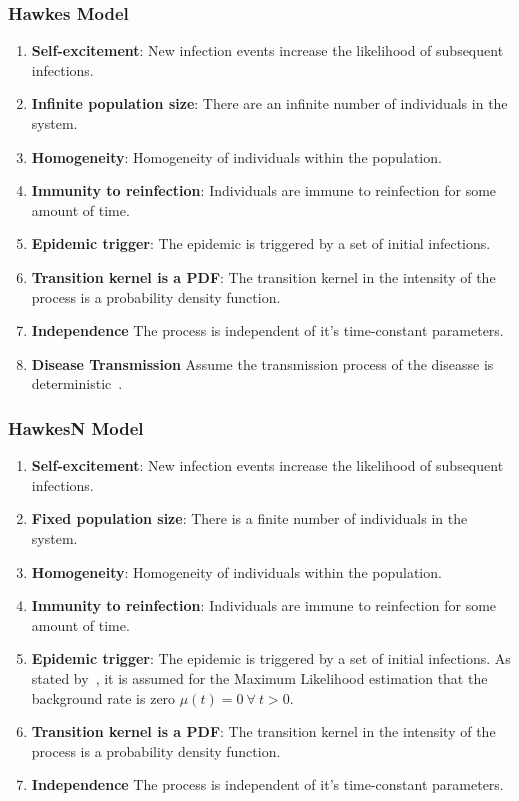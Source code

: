 \documentclass[12pt]{article}
\begin{document}
\subsubsection{Hawkes Model}
\begin{enumerate}
\item {\bf Self-excitement}: New infection events increase the likelihood of subsequent infections. 
\item {\bf Infinite population size}: There are an infinite number of individuals in the system.
\item {\bf Homogeneity}: Homogeneity of individuals within the population.
\item {\bf Immunity to reinfection}: Individuals are immune to reinfection for some amount of time. 
\item {\bf Epidemic trigger}: The epidemic is triggered by a set of initial infections.
\item {\bf Transition kernel is a PDF}: The transition kernel in the intensity of the process is a probability density function. 
\item {\bf Independence} The process is independent of it's time-constant parameters. 
\item {\bf Disease Transmission} Assume the transmission process of the diseasse is deterministic~\cite{Brauer2019}. 
\end{enumerate}


\subsubsection{HawkesN Model}
\begin{enumerate}
\item {\bf Self-excitement}: New infection events increase the likelihood of subsequent infections.
\item {\bf Fixed population size}: There is a finite number of individuals in the system.
\item {\bf Homogeneity}: Homogeneity of individuals within the population.
\item {\bf Immunity to reinfection}: Individuals are immune to reinfection for some amount of time. 
\item {\bf Epidemic trigger}: The epidemic is triggered by a set of initial infections. As stated by~\cite{Rizoiu2018}, it is assumed for the Maximum Likelihood estimation that the background rate is zero $\mu(t) = 0\ \forall\ t>0$. 
\item {\bf Transition kernel is a PDF}: The transition kernel in the intensity of the process is a probability density function. 
\item {\bf Independence} The process is independent of it's time-constant parameters. 
\end{enumerate}
\end{document}
